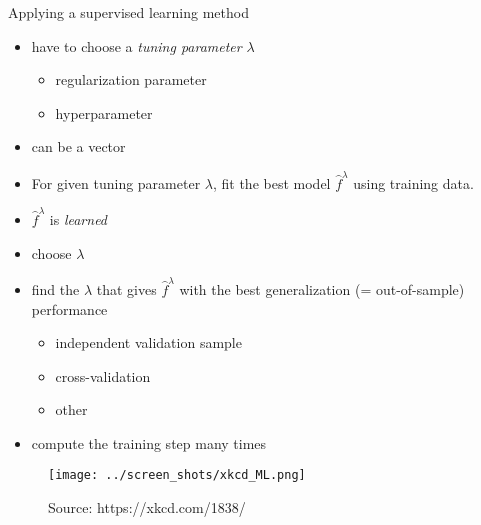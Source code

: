 \documentclass[xcolor=dvipsnames, handout]{beamer}
\begin{document}
\begin{frame}{Applying a supervised learning method}
\begin{itemize}
  \item have to choose a \emph{tuning parameter} $\lambda$
  \begin{itemize}
    \item regularization parameter
    \item hyperparameter
  \end{itemize}
  \item can be a vector
\end{itemize}
\pause 
\begin{description}[<+->]
  \item[Training the model] 
  \begin{itemize}
    \item 
    For given tuning parameter $\lambda$, fit the best model $\hat{f}^{\lambda}$ using training data.
    \item 
    $\hat{f}^{\lambda}$ is \emph{learned}
  \end{itemize}
  \item[Hyperparameter optimization] 
  \begin{itemize}
    \item choose $\lambda$
    \item find the $\lambda$ that gives $\hat{f}^{\lambda}$ with the best generalization (= out-of-sample) performance
    \begin{itemize}
      \item independent validation sample 
      \item cross-validation 
      \item other 
    \end{itemize}
    \item compute the training step many times
  \end{itemize}
\end{description}
\end{frame}

\begin{frame}
\begin{figure}
  \texttt{[image: ../screen\_shots/xkcd\_ML.png]}
   \caption{Source: https://xkcd.com/1838/}
\end{figure}
\end{frame}
\end{document}
